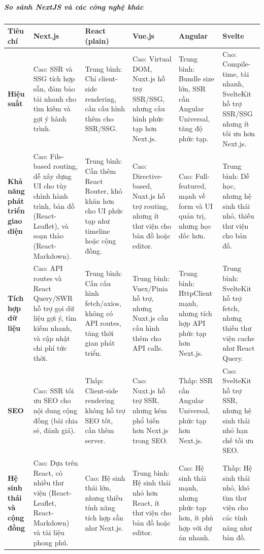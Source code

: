 \subparagraph{So sánh NextJS và các công nghệ khác}
\clearpage 
\begin{landscape}
\begin{table}[h!]
\centering
\setlength{\tabcolsep}{4pt} %
\footnotesize %
\begin{tabularx}{\linewidth}{|l|X|X|X|X|X|}
\hline
\textbf{Tiêu chí} & \textbf{Next.js} & \textbf{React (plain)} & \textbf{Vue.js} & \textbf{Angular} & \textbf{Svelte} \\
\hline
\textbf{Hiệu suất} & Cao: SSR và SSG tích hợp sẵn, đảm bảo tải nhanh cho tìm kiếm và gợi ý hành trình. & Trung bình: Chỉ client-side rendering, cần cấu hình thêm cho SSR/SSG. & Cao: Virtual DOM, Nuxt.js hỗ trợ SSR/SSG, nhưng cấu hình phức tạp hơn Next.js. & Trung bình: Bundle size lớn, SSR cần Angular Universal, tăng độ phức tạp. & Cao: Compile-time, tải nhanh, SvelteKit hỗ trợ SSR/SSG nhưng ít tối ưu hơn Next.js. \\
\hline
\textbf{Khả năng phát triển giao diện} & Cao: File-based routing, dễ xây dựng UI cho tùy chỉnh hành trình, bản đồ (React-Leaflet), và soạn thảo (React-Markdown). & Trung bình: Cần thêm React Router, khó khăn hơn cho UI phức tạp như timeline hoặc cộng đồng. & Cao: Directive-based, Nuxt.js hỗ trợ routing, nhưng ít thư viện cho bản đồ hoặc editor. & Cao: Full-featured, mạnh về form và UI quản trị, nhưng học dốc hơn. & Trung bình: Dễ học, nhưng hệ sinh thái nhỏ, thiếu thư viện cho bản đồ. \\
\hline
\textbf{Tích hợp dữ liệu} & Cao: API routes và React Query/SWR hỗ trợ gọi dữ liệu gợi ý, tìm kiếm nhanh, và cập nhật chi phí tức thời. & Trung bình: Cần cấu hình fetch/axios, không có API routes, tăng thời gian phát triển. & Trung bình: Vuex/Pinia hỗ trợ, nhưng Nuxt.js cần cấu hình thêm cho API calls. & Trung bình: HttpClient mạnh, nhưng tích hợp API phức tạp hơn Next.js. & Trung bình: SvelteKit hỗ trợ fetch, nhưng thiếu thư viện cache như React Query. \\
\hline
\textbf{SEO} & Cao: SSR tối ưu SEO cho nội dung cộng đồng (bài chia sẻ, đánh giá). & Thấp: Client-side rendering không hỗ trợ SEO tốt, cần thêm server. & Cao: Nuxt.js hỗ trợ SSR, nhưng kém phổ biến hơn Next.js trong SEO. & Thấp: SSR cần Angular Universal, phức tạp hơn Next.js. & Cao: SvelteKit hỗ trợ SSR, nhưng hệ sinh thái nhỏ hạn chế tối ưu SEO. \\
\hline
\textbf{Hệ sinh thái và cộng đồng} & Cao: Dựa trên React, có nhiều thư viện (React-Leaflet, React-Markdown) và tài liệu phong phú. & Cao: Hệ sinh thái lớn, nhưng thiếu tính năng tích hợp sẵn như Next.js. & Trung bình: Hệ sinh thái nhỏ hơn React, ít thư viện cho bản đồ hoặc editor. & Cao: Hệ sinh thái mạnh, nhưng phức tạp hơn, ít phù hợp với dự án nhanh. & Thấp: Hệ sinh thái nhỏ, khó tìm thư viện cho các tính năng như bản đồ. \\

\end{tabularx}
\end{table}
\end{landscape}
